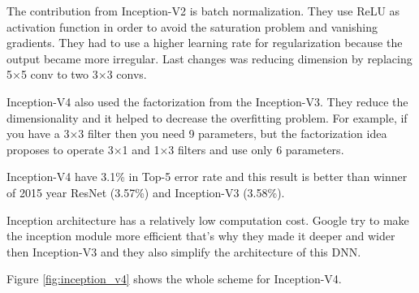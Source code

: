 \documentclass[titlepage]{report}
\begin{document}
The contribution from Inception-V2 is batch normalization. They use ReLU as activation function in order to avoid the saturation problem and vanishing gradients. They had to use a higher learning rate for regularization because the output became more irregular. Last changes was reducing dimension by replacing   5×5 conv to two 3×3 convs. 

Inception-V4 also used the factorization from the Inception-V3. They reduce the dimensionality and it helped to decrease the overfitting problem. For example, if you have a 3×3 filter then you need 9 parameters, but the factorization idea proposes to operate  3×1 and  1×3 filters and use only 6 parameters. 

Inception-V4 have 3.1\% in Top-5 error rate and this result is better than winner of 2015 year ResNet (3.57\%) and  Inception-V3 (3.58\%). 

Inception architecture has a relatively low computation cost. Google try to make the inception module more efficient that's why they made it deeper and wider then Inception-V3 and they also simplify the architecture of this DNN.

Figure \ref{fig:inception_v4} shows the whole scheme for Inception-V4.
\end{document}
